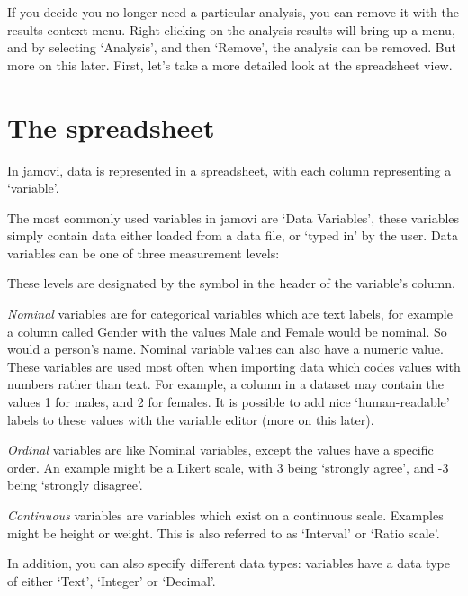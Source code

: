 If you decide you no longer need a particular analysis, you can remove it with the results context menu. Right-clicking on the analysis results will bring up a menu, and by selecting ‘Analysis’, and then ‘Remove’, the analysis can be removed. But more on this later. First, let's take a more detailed look at the spreadsheet view.


\section{The spreadsheet\label{sec:spreadsheet}}

In jamovi, data is represented in a spreadsheet, with each column representing a ‘variable’.


The most commonly used variables in jamovi are ‘Data Variables’, these variables simply contain data either loaded from a data file, or ‘typed in’ by the user. Data variables can be one of three measurement levels:

\begin{figure}[ht]
\end{figure}

These levels are designated by the symbol in the header of the variable’s column.

{\it Nominal} variables are for categorical variables which are text labels, for example a column called Gender with the values Male and Female would be nominal. So would a person’s name. Nominal variable values can also have a numeric value. These variables are used most often when importing data which codes values with numbers rather than text. For example, a column in a dataset may contain the values 1 for males, and 2 for females. It is possible to add nice ‘human-readable’ labels to these values with the variable editor (more on this later).

{\it Ordinal} variables are like Nominal variables, except the values have a specific order. An example might be a Likert scale, with 3 being ‘strongly agree’, and -3 being ‘strongly disagree’.

{\it Continuous} variables are variables which exist on a continuous scale. Examples might be height or weight. This is also referred to as ‘Interval’ or ‘Ratio scale’.

In addition, you can also specify different data types: variables have a data type of either ‘Text’, ‘Integer’ or ‘Decimal’. 

